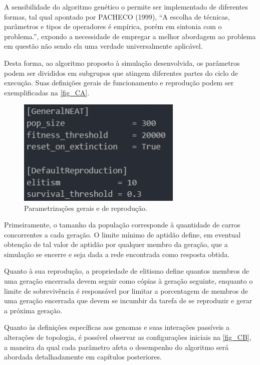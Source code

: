 A sensibilidade do algoritmo genético o permite ser implementado de diferentes formas, tal qual apontado por PACHECO (1999), “A escolha de técnicas, parâmetros e tipos de operadores é empírica, porém em sintonia com o problema.”, expondo a necessidade de empregar a melhor abordagem ao problema em questão não sendo ela uma verdade universalmente aplicável.

Desta forma, ao algoritmo proposto à simulação desenvolvida, os parâmetros podem ser divididos em subgrupos que atingem diferentes partes do ciclo de execução. Suas definições gerais de funcionamento e reprodução podem ser exemplificadas na \autoref{fig_CA}.

\begin{figure}[htb]
        \centering
        \caption{\label{fig_CA}Parametrizações gerais e de reprodução.}
        \includegraphics[width=0.7\textwidth]{images/CA.png}
\end{figure}

Primeiramente, o tamanho da população corresponde à quantidade de carros concorrentes a cada geração. O limite mínimo de aptidão define, em eventual obtenção de tal valor de aptidão por qualquer membro da geração, que a simulação se encerre e seja dada a rede encontrada como resposta obtida.

Quanto à sua reprodução, a propriedade de elitismo define quantos membros de uma geração encerrada devem seguir como cópias à geração seguinte, enquanto o limite de sobrevivência é responsável por limitar a porcentagem de membros de uma geração encerrada que devem se incumbir da tarefa de se reproduzir e gerar a próxima geração.

Quanto às definições específicas aos genomas e suas interações passíveis a alterações de topologia, é possível observar as configurações iniciais na \autoref{fig_CB}, a maneira da qual cada parâmetro afeta o desempenho do algoritmo será abordada detalhadamente em capítulos posteriores.

